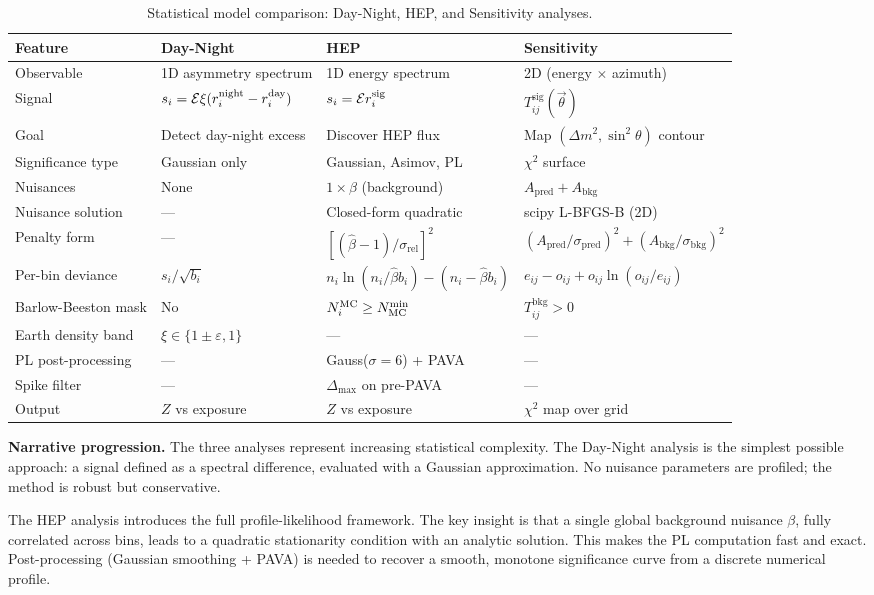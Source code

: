\documentclass[12pt,a4paper]{article}
\newcommand{\bhat}{\hat{\beta}}
\newcommand{\srel}{\sigma_{\mathrm{rel}}}
\newcommand{\Tsig}{T^{\mathrm{sig}}}
\newcommand{\Tbkg}{T^{\mathrm{bkg}}}
\newcommand{\Apred}{A_{\mathrm{pred}}}
\newcommand{\Abkg}{A_{\mathrm{bkg}}}
\newcommand{\spred}{\sigma_{\mathrm{pred}}}
\newcommand{\sbkg}{\sigma_{\mathrm{bkg}}}
\begin{document}
\begin{table}[ht]
\centering
\caption{Statistical model comparison: Day-Night, HEP, and Sensitivity analyses.}
\label{tab:comparison}
\begin{tabular}{llll}
\toprule
Feature & Day-Night & HEP & Sensitivity \\
\midrule
Observable & 1D asymmetry spectrum & 1D energy spectrum & 2D (energy $\times$ azimuth) \\
Signal & $s_i = \mathcal{E}\xi(r_i^{\rm night}-r_i^{\rm day})$ & $s_i = \mathcal{E}r_i^{\rm sig}$ & $\Tsig_{ij}(\vec{\theta})$ \\
Goal & Detect day-night excess & Discover HEP flux & Map $(\Delta m^2,\sin^2\theta)$ contour \\
Significance type & Gaussian only & Gaussian, Asimov, PL & $\chi^2$ surface \\
Nuisances & None & $1\times\beta$ (background) & $\Apred + \Abkg$ \\
Nuisance solution & --- & Closed-form quadratic & scipy L-BFGS-B (2D) \\
Penalty form & --- & $[(\bhat-1)/\srel]^2$ & $(\Apred/\spred)^2+(\Abkg/\sbkg)^2$ \\
Per-bin deviance & $s_i/\sqrt{b_i}$ & $n_i\ln(n_i/\bhat b_i)-(n_i-\bhat b_i)$ & $e_{ij}-o_{ij}+o_{ij}\ln(o_{ij}/e_{ij})$ \\
Barlow-Beeston mask & No & $N_i^{\rm MC}\ge N_{\rm MC}^{\min}$ & $\Tbkg_{ij}>0$ \\
Earth density band & $\xi\in\{1\pm\varepsilon,1\}$ & --- & --- \\
PL post-processing & --- & Gauss($\sigma=6$) + PAVA & --- \\
Spike filter & --- & $\Delta_{\max}$ on pre-PAVA & --- \\
Output & $Z$ vs exposure & $Z$ vs exposure & $\chi^2$ map over grid \\
\bottomrule
\end{tabular}
\end{table}

\medskip
\noindent\textbf{Narrative progression.}
The three analyses represent increasing statistical complexity.
The Day-Night analysis is the simplest possible approach: a signal defined as
a spectral difference, evaluated with a Gaussian approximation.
No nuisance parameters are profiled; the method is robust but conservative.

The HEP analysis introduces the full profile-likelihood framework.
The key insight is that a single global background nuisance $\beta$,
fully correlated across bins, leads to a quadratic stationarity condition
with an analytic solution.  This makes the PL computation fast and exact.
Post-processing (Gaussian smoothing + PAVA) is needed to recover a smooth,
monotone significance curve from a discrete numerical profile.
\end{document}
